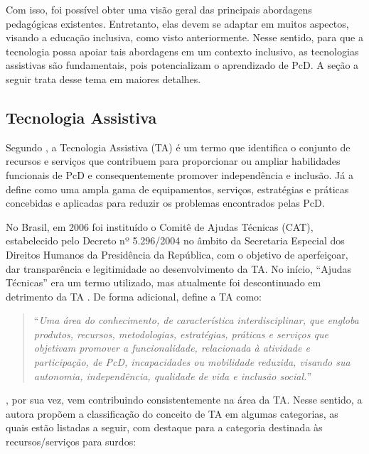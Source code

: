 Com isso, foi possível obter uma visão geral das principais abordagens pedagógicas existentes. Entretanto, elas devem se adaptar em muitos aspectos, visando a educação inclusiva, como visto anteriormente. Nesse sentido, para que a tecnologia possa apoiar tais abordagens em um contexto inclusivo, as tecnologias assistivas são fundamentais, pois potencializam o aprendizado de PcD. A seção a seguir trata desse tema em maiores detalhes.

\subsection{Tecnologia Assistiva}
\label{fundamentacao-teorica:tic:assistiva}

Segundo , a Tecnologia Assistiva (TA) é um termo que identifica o conjunto de recursos e serviços que contribuem para proporcionar ou ampliar habilidades funcionais de PcD e consequentemente promover independência e inclusão. Já \cite{Cook2015} a define como uma ampla gama de equipamentos, serviços, estratégias e práticas concebidas e aplicadas para reduzir os problemas encontrados pelas PcD.

No Brasil, em 2006 foi instituído o Comitê de Ajudas Técnicas (CAT), estabelecido pelo Decreto nº 5.296/2004 no âmbito da Secretaria Especial dos Direitos Humanos da Presidência da República, com o objetivo de aperfeiçoar, dar transparência e legitimidade ao desenvolvimento da TA. No início, ``Ajudas Técnicas'' era um termo utilizado, mas atualmente foi descontinuado em detrimento da TA \cite{Cat2008}. De forma adicional,  define a TA como:

\begin{quote}
``\textit{Uma área do conhecimento, de característica interdisciplinar, que engloba produtos, recursos, metodologias, estratégias, práticas e serviços que objetivam promover a funcionalidade, relacionada à atividade e participação, de PcD, incapacidades ou mobilidade reduzida, visando sua autonomia, independência, qualidade de vida e inclusão social.}''
\end{quote}

, por sua vez, vem contribuindo consistentemente na área da TA. Nesse sentido, a autora propõem a classificação do conceito de TA em algumas categorias, as quais estão listadas a seguir, com destaque para a categoria destinada às recursos/serviços para surdos:

